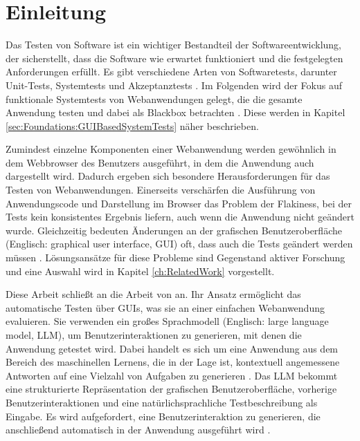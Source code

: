 
\chapter{Einleitung}
\label{ch:Introduction}


Das Testen von Software ist ein wichtiger Bestandteil der Softwareentwicklung, der sicherstellt, dass die Software wie erwartet funktioniert und die festgelegten Anforderungen erfüllt.
Es gibt verschiedene Arten von Softwaretests, darunter Unit-Tests, Systemtests und Akzeptanztests \cite{Sommerville10}.
Im Folgenden wird der Fokus auf funktionale Systemtests von Webanwendungen gelegt, die die gesamte Anwendung testen und dabei als Blackbox betrachten \cite{Beizer1990}.
Diese werden in Kapitel \ref{sec:Foundations:GUIBasedSystemTests} näher beschrieben.


Zumindest einzelne Komponenten einer Webanwendung werden gewöhnlich in dem Webbrowser des Benutzers ausgeführt, in dem die Anwendung auch dargestellt wird.
Dadurch ergeben sich besondere Herausforderungen für das Testen von Webanwendungen.
Einerseits verschärfen die Ausführung von Anwendungscode und Darstellung im Browser das Problem der Flakiness, bei der Tests kein konsistentes Ergebnis liefern, auch wenn die Anwendung nicht geändert wurde.
Gleichzeitig bedeuten Änderungen an der grafischen Benutzeroberfläche (Englisch: graphical user interface, GUI) oft, dass auch die Tests geändert werden müssen \cite{ChallengesSelenium}.
Lösungsansätze für diese Probleme sind Gegenstand aktiver Forschung und eine Auswahl wird in Kapitel \ref{ch:RelatedWork} vorgestellt.


Diese Arbeit schließt an die Arbeit von  an.
Ihr Ansatz ermöglicht das automatische Testen über GUIs, was sie an einer einfachen Webanwendung evaluieren.
Sie verwenden ein großes Sprachmodell (Englisch: large language model, LLM), um Benutzerinteraktionen zu generieren, mit denen die Anwendung getestet wird.
Dabei handelt es sich um eine Anwendung aus dem Bereich des maschinellen Lernens, die in der Lage ist, kontextuell angemessene Antworten auf eine Vielzahl von Aufgaben zu generieren \cite{FewShotLearners}.
Das LLM bekommt eine strukturierte Repräsentation der grafischen Benutzeroberfläche, vorherige Benutzerinteraktionen und eine natürlichsprachliche Testbeschreibung als Eingabe.
Es wird aufgefordert, eine Benutzerinteraktion zu generieren, die anschließend automatisch in der Anwendung ausgeführt wird \cite{GPT3Testing}.

